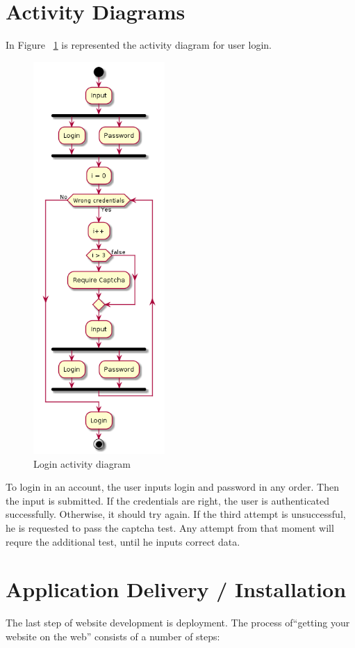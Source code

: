 \documentclass[12pt,a4paper,titlepage]{article}
\begin{document}
\section{Activity Diagrams}
In Figure ~\ref{fig:login} is represented the activity diagram for user login.
\begin{figure}[H]
\centering
	\includegraphics[width=5cm]{login}
	\caption{Login activity diagram}
	\label{fig:login}
\end{figure}
To login in an account, the user inputs login and password in any order. Then the input is submitted. If the credentials are right, the user is authenticated successfully. Otherwise, it should try again. If the third attempt is unsuccessful, he is requested to pass the captcha test. Any attempt from that moment will requre the additional test, until he inputs correct data.


\section{Application Delivery / Installation}
The last step of website development is deployment. The process of“getting your website on the web” consists of a number of steps:
\end{document}

